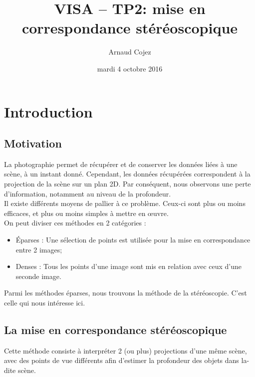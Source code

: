 \documentclass[a4paper]{article}
\begin{document}
\title{VISA -- TP2: mise en correspondance stéréoscopique}
\author{Arnaud Cojez}
\date{mardi 4 octobre 2016}

\maketitle

\newpage
\tableofcontents
\newpage

\section{Introduction}

\subsection{Motivation}

La photographie permet de récupérer et de conserver les données liées à une scène, à un instant donné. Cependant, les données récupérées correspondent à la projection de la scène sur un plan 2D. Par conséquent, nous observons une perte d'information, notamment au niveau de la profondeur.\\

Il existe différents moyens de pallier à ce problème. Ceux-ci sont plus ou moins efficaces, et plus ou moins simples à mettre en œuvre.\\
On peut diviser ces méthodes en 2 catégories :
\begin{itemize}
    \item Éparses : Une sélection de points est utilisée pour la mise en correspondance entre 2 images;
    \item Denses : Tous les points d'une image sont mis en relation avec ceux d'une seconde image.
\end{itemize}

Parmi les méthodes éparses, nous trouvons la méthode de la stéréoscopie. C'est celle qui nous intéresse ici.

\subsection{La mise en correspondance stéréoscopique}

Cette méthode consiste à interpréter 2 (ou plus) projections d'une même scène, avec des points de vue différents afin d'estimer la profondeur des objets dans la-dite scène.\\
\end{document}
